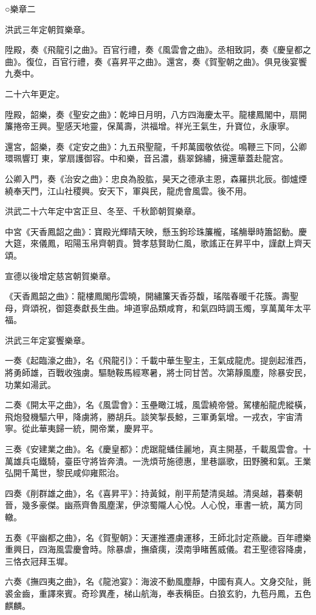○樂章二

洪武三年定朝賀樂章。

陞殿，奏《飛龍引之曲》。百官行禮，奏《風雲會之曲》。丞相致詞，奏《慶皇都之曲》。復位，百官行禮，奏《喜昇平之曲》。還宮，奏《賀聖朝之曲》。俱見後宴饗九奏中。

二十六年更定。

陞殿，韶樂，奏《聖安之曲》：乾坤日月明，八方四海慶太平。龍樓鳳閣中，扇開簾捲帝王興。聖感天地靈，保萬壽，洪福增。祥光王氣生，升寶位，永康寧。

還宮，韶樂，奏《定安之曲》：九五飛聖龍，千邦萬國敬依從。鳴鞭三下同，公卿環珮響玎東，掌扇護御容。中和樂，音呂濃，翡翠錦繡，擁還華蓋赴龍宮。

公卿入門，奏《治安之曲》：忠良為股肱，昊天之德承主恩，森羅拱北辰。御爐煙繞奉天門，江山社稷興。安天下，軍與民，龍虎會風雲。後不用。

洪武二十六年定中宮正旦、冬至、千秋節朝賀樂章。

中宮《天香鳳韶之曲》：寶殿光輝晴天映，懸玉鉤珍珠簾櫳，瑤觴舉時簫韶動。慶大筵，來儀鳳，昭陽玉帛齊朝貢。贊孝慈賢助仁風，歌謠正在昇平中，謹獻上齊天頌。

宣德以後增定慈宮朝賀樂章。

《天香鳳韶之曲》：龍樓鳳閣彤雲曉，開繡簾天香芬馥，瑤階春暖千花簇。壽聖母，齊頌祝，御筵奏獻長生曲。坤道寧品類咸育，和氣四時調玉燭，享萬萬年太平福。

洪武三年定宴饗樂章。

一奏《起臨濠之曲》，名《飛龍引》：千載中華生聖主，王氣成龍虎。提劍起淮西，將勇師雄，百戰收強虜。驅馳鞍馬經寒暑，將士同甘苦。次第靜風塵，除暴安民，功業如湯武。

二奏《開太平之曲》，名《風雲會》：玉壘瞰江城，風雲繞帝營。駕樓船龍虎縱橫，飛炮發機驅六甲，降虜將，勝胡兵。談笑掣長鯨，三軍勇氣增。一戎衣，宇宙清寧。從此華夷歸一統，開帝業，慶昇平。

三奏《安建業之曲》。名《慶皇都》：虎踞龍蟠佳麗地，真主開基，千載風雲會。十萬雄兵屯鐵騎，臺臣守將皆奔潰。一洗煩苛施德惠，里巷謳歌，田野騰和氣。王業弘開千萬世，黎民咸仰雍熙治。

四奏《削群雄之曲》，名《喜昇平》：持黃鉞，削平荊楚清吳越。清吳越，暮秦朝晉，幾多豪傑。幽燕齊魯風塵潔，伊涼蜀隴人心悅。人心悅，車書一統，萬方同轍。

五奏《平幽都之曲》，名《賀聖朝》：天運推遷虜運移，王師北討定燕畿。百年禮樂重興日，四海風雲慶會時。除暴虐，撫瘡痍，漠南爭睹舊威儀。君王聖德容降虜，三恪衣冠拜玉墀。

六奏《撫四夷之曲》，名《龍池宴》：海波不動風塵靜，中國有真人。文身交阯，氈裘金齒，重譯來賓。奇珍異產，梯山航海，奉表稱臣。白狼玄豹，九苞丹鳳，五色麒麟。

